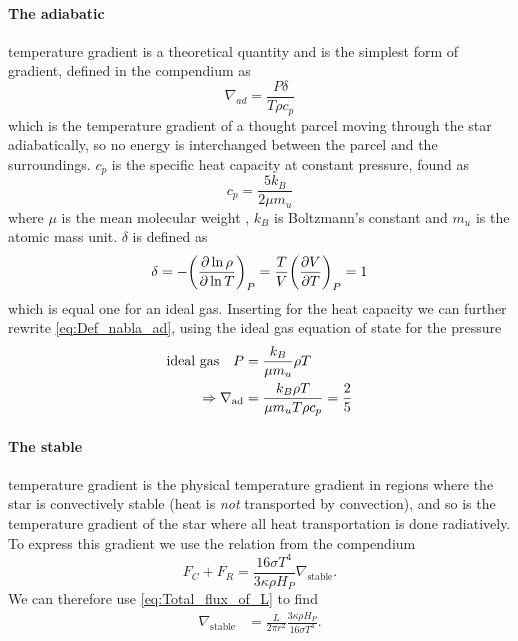 \documentclass[11pt,a4paper,twocolumn,titlepage]{article}
\newcommand{\nablastb}
{
\nabla_{\text{stable}}
}
\newcommand{\nablaad}
{
\nabla_{\text{ad}}
}
\begin{document}
\paragraph{The adiabatic} temperature gradient is a theoretical quantity and is the simplest form of gradient, defined in the compendium as
\begin{equation}
\nabla_{ad} = \frac{P\delta}{T\rho c_p} \label{eq:Def_nabla_ad}
\end{equation}
which is the temperature gradient of a thought parcel moving through the star adiabatically, so no energy is interchanged between the parcel and the surroundings. $c_p$ is the specific heat capacity at constant pressure, found as
\begin{equation}
c_p = \frac{5k_B}{2\mu m_u}
\end{equation}
where $\mu$ is the mean molecular weight \citep{Project1}, $k_B$ is Boltzmann's constant and $m_u$ is the atomic mass unit. $\delta$ is defined as
\begin{equation}
\delta = -\qty(\pdv{\ln\rho}{\ln T})_P = \frac{T}{V}\qty(\pdv{V}{T})_P = 1
\end{equation}
which is equal one for an ideal gas. Inserting for the heat capacity we can further rewrite \cref{eq:Def_nabla_ad}, using the ideal gas equation of state for the pressure
\begin{align}
\qq*{ideal gas} P &= \frac{k_B}{\mu m_u}\rho T \notag
\\
\Rightarrow \nablaad &= \frac{k_B\rho T}{\mu m_u T \rho c_p} = \frac{2}{5} \label{eq:Nabla_ad_constant}
\end{align}

\paragraph{The stable} temperature gradient is the physical temperature gradient in regions where the star is convectively stable (heat is \textit{not} transported by convection), and so is the temperature gradient of the star where all heat transportation is done radiatively. To express this gradient we use the relation from the compendium
\begin{equation}
F_C + F_R = \frac{16\sigma T^4}{3\kappa\rho H_P}\nablastb. \label{eq:Nabla_stb_compendium}
\end{equation}
We can therefore use \cref{eq:Total_flux_of_L} to find
\begin{align}
\nablastb &= \frac{L}{2\pi r^2}\frac{3\kappa\rho H_P}{16\sigma T^4}. \label{eq:Nabla_stb}
\end{align}
\end{document}
